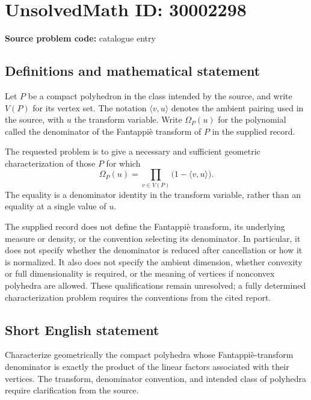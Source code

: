\documentclass[11pt]{article}
\begin{document}
\section*{UnsolvedMath ID: 30002298}
\textbf{Source problem code:} catalogue entry
\subsection{Definitions and mathematical statement}
Let \(P\) be a compact polyhedron in the class intended by the source, and write \(V(P)\) for its vertex set. The notation \(\langle v,u\rangle\) denotes the ambient pairing used in the source, with \(u\) the transform variable. Write \(\Omega_P(u)\) for the polynomial called the denominator of the Fantappi\`e transform of \(P\) in the supplied record.

The requested problem is to give a necessary and sufficient geometric characterization of those \(P\) for which
\[
\Omega_P(u)=\prod_{v\in V(P)}\bigl(1-\langle v,u\rangle\bigr).
\]
The equality is a denominator identity in the transform variable, rather than an equality at a single value of \(u\).

The supplied record does not define the Fantappi\`e transform, its underlying measure or density, or the convention selecting its denominator. In particular, it does not specify whether the denominator is reduced after cancellation or how it is normalized. It also does not specify the ambient dimension, whether convexity or full dimensionality is required, or the meaning of vertices if nonconvex polyhedra are allowed. These qualifications remain unresolved; a fully determined characterization problem requires the conventions from the cited report.
\subsection{Short English statement}
Characterize geometrically the compact polyhedra whose Fantappi\`e-transform denominator is exactly the product of the linear factors associated with their vertices. The transform, denominator convention, and intended class of polyhedra require clarification from the source.
\end{document}
